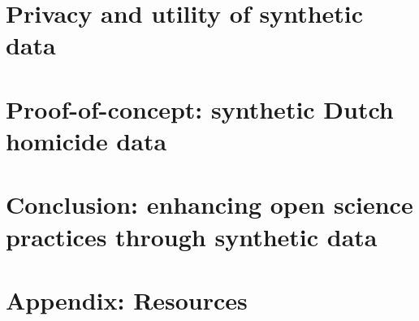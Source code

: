 \documentclass[12pt, twoside]{book}
\begin{document}
\chapter{Privacy and utility of synthetic data}


\chapter{Proof-of-concept: synthetic Dutch homicide data}


\chapter{Conclusion: enhancing open science practices through synthetic data}



\chapter{Appendix: Resources}


\printbibliography

\end{document}
